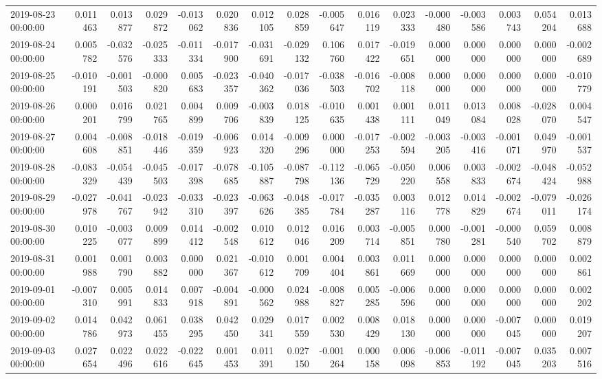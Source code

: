 \begin{tabular}{lrrrrrrrrrrrrrrr}
2019-08-23 00:00:00 & 0.011463 & 0.013877 & 0.029872 & -0.013062 & 0.020836 & 0.012105 & 0.028859 & -0.005647 & 0.016119 & 0.023333 & -0.000480 & -0.003586 & 0.003743 & 0.054204 & 0.013688 \\
2019-08-24 00:00:00 & 0.005782 & -0.032576 & -0.025333 & -0.011334 & -0.017900 & -0.031691 & -0.029132 & 0.106760 & 0.017422 & -0.019651 & 0.000000 & 0.000000 & 0.000000 & 0.000000 & -0.002689 \\
2019-08-25 00:00:00 & -0.010191 & -0.001503 & -0.000820 & 0.005683 & -0.023357 & -0.040362 & -0.017036 & -0.038503 & -0.016702 & -0.008118 & 0.000000 & 0.000000 & 0.000000 & 0.000000 & -0.010779 \\
2019-08-26 00:00:00 & 0.000201 & 0.016799 & 0.021765 & 0.004899 & 0.009706 & -0.003839 & 0.018125 & -0.010635 & 0.001438 & 0.001111 & 0.011049 & 0.013084 & 0.008028 & -0.028070 & 0.004547 \\
2019-08-27 00:00:00 & 0.004608 & -0.008851 & -0.018446 & -0.019359 & -0.006923 & 0.014320 & -0.009296 & 0.000000 & -0.017253 & -0.002594 & -0.003205 & -0.003416 & -0.001071 & 0.049970 & -0.001537 \\
2019-08-28 00:00:00 & -0.083329 & -0.054439 & -0.045503 & -0.017398 & -0.078685 & -0.105887 & -0.087798 & -0.112136 & -0.065729 & -0.050220 & 0.006558 & 0.003833 & -0.002674 & -0.048424 & -0.052988 \\
2019-08-29 00:00:00 & -0.027978 & -0.041767 & -0.023942 & -0.033310 & -0.023397 & -0.063626 & -0.048385 & -0.017784 & -0.035287 & 0.003116 & 0.012778 & 0.014829 & -0.002674 & -0.079011 & -0.026174 \\
2019-08-30 00:00:00 & 0.010225 & -0.003077 & 0.009899 & 0.014412 & -0.002548 & 0.010612 & 0.012046 & 0.016209 & 0.003714 & -0.005851 & 0.000780 & -0.001281 & -0.000540 & 0.059702 & 0.008879 \\
2019-08-31 00:00:00 & 0.001988 & 0.001790 & 0.003882 & 0.000000 & 0.021367 & -0.010612 & 0.001709 & 0.004404 & 0.003861 & 0.011669 & 0.000000 & 0.000000 & 0.000000 & 0.000000 & 0.002861 \\
2019-09-01 00:00:00 & -0.007310 & 0.005991 & 0.014833 & 0.007918 & -0.004891 & -0.000562 & 0.024988 & -0.008827 & 0.005285 & -0.006596 & 0.000000 & 0.000000 & 0.000000 & 0.000000 & 0.002202 \\
2019-09-02 00:00:00 & 0.014786 & 0.042973 & 0.061455 & 0.038295 & 0.042450 & 0.029341 & 0.017559 & 0.002530 & 0.008429 & 0.018130 & 0.000000 & 0.000000 & -0.007045 & 0.000000 & 0.019207 \\
2019-09-03 00:00:00 & 0.027654 & 0.022496 & 0.022616 & -0.022645 & 0.001453 & 0.011391 & 0.027150 & -0.001264 & 0.000158 & 0.006098 & -0.006853 & -0.011192 & -0.007045 & 0.035203 & 0.007516 \\

\end{tabular}

